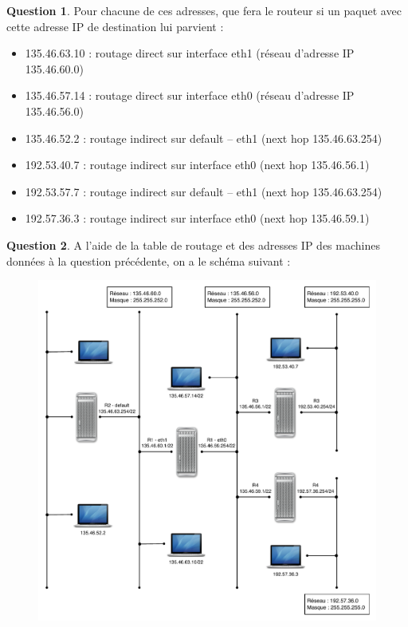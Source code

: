 \documentclass[11pt,english,french]{scrreprt}
\theoremstyle{remark}
\theoremstyle{definition}
\newtheorem{ques}{Question}[section]
\begin{document}
\begin{ques}
	Pour chacune de ces adresses, que fera le routeur si un paquet avec cette adresse IP de destination lui parvient :\begin{itemize}
		\item 135.46.63.10 : routage direct sur interface eth1 (réseau d'adresse IP 135.46.60.0)
		\item 135.46.57.14 : routage direct sur interface eth0 (réseau d'adresse IP 135.46.56.0)
		\item 135.46.52.2 : routage indirect sur default -- eth1 (next hop 135.46.63.254)
		\item 192.53.40.7 : routage indirect sur interface eth0 (next hop 135.46.56.1)
		\item 192.53.57.7 : routage indirect sur default -- eth1 (next hop 135.46.63.254)
		\item 192.57.36.3 : routage indirect sur interface eth0 (next hop 135.46.59.1)
	\end{itemize}
\end{ques}

\begin{ques}
	A l'aide de la table de routage et des adresses IP des machines données à la question précédente, on a le schéma suivant :
	
	\begin{figure}[h]
		\center
		\includegraphics[scale=.7]{Exam2009/reseau-local}
	\end{figure}
\end{ques}
\end{document}
